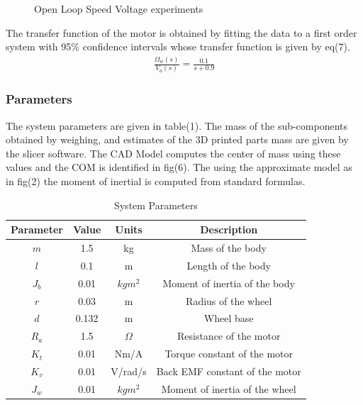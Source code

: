         \begin{figure}[H]
            \centering
            \caption{Open Loop Speed Voltage experiments}
        \end{figure}    
        The transfer function of the motor is obtained by fitting the data to a first order system 
        with 95\% confidence intervals whose transfer function is given by eq(7).
        \begin{equation}
            \begin{aligned}
                \frac{\Omega_w \left(s\right)}{V_a \left(s\right)}=\frac{0.1}{s+0.9}
            \end{aligned}
        \end{equation}

        \pagebreak{}
        \subsubsection{Parameters }
        The system parameters are given in table(1). 
        The mass of the sub-components obtained by weighing,
        and estimates of the 3D printed parts mass are given by the slicer software. 
        The CAD Model computes the center of mass using these values and the COM is identified in fig(6).
        The using the approximate model as in fig(2) the moment of inertial is computed from standard formulas.
        \begin{table} [H]
            \centering
            \begin{tabular}{|c|c|c|c|}
                \hline
                Parameter & Value & Units & Description \\
                \hline
                $m$ & 1.5 & kg & Mass of the body \\
                $l$ & 0.1 & m & Length of the body \\
                $J_b$ & 0.01 & $kgm^2$ & Moment of inertia of the body \\
                $r$ & 0.03 & m & Radius of the wheel \\
                $d$ & 0.132 & m & Wheel base \\
                $R_a$ & 1.5 & $\Omega$ & Resistance of the motor \\
                $K_t$ & 0.01 & Nm/A & Torque constant of the motor \\
                $K_v$ & 0.01 & V/rad/s & Back EMF constant of the motor \\
                $J_w$ & 0.01 & $kgm^2$ & Moment of inertia of the wheel \\
                \hline
            \end{tabular}
            \caption{System Parameters}
        \end{table}

